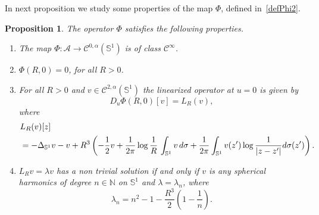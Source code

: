 \documentclass[10pt,reqno,english]{amsart}
\newcommand{\Su}{\mathbb{S}^1}
\newcommand{\N}{\mathbb{N}}
\newtheorem{prop}[lemma]{Proposition}
\theoremstyle{definition}
\numberwithin{equation}{section}
\begin{document}
In next proposition we study some properties of the map $\Phi$, defined in~\eqref{defPhi2}.

\begin{prop}
\label{prop-2d}
The operator $\Phi$ satisfies the following properties.
\begin{enumerate}
\item The map $\Phi:\mathcal A\to\mathcal C^{0,\alpha}(\Su)$ is of class $\mathcal C^\infty$.
\item $\Phi(R,0)=0$, for all $R>0$.
\item For all $R>0$ and $v\in\mathcal C^{2,\alpha}(\Su)$ the linearized operator at $u=0$ is given by
\[
D_u\Phi(R,0)[v]=L_R(v),
\]
where
\begin{align*} 
&L_R(v)[z]\\
&=- \Delta_{\mathbb{S}^1} v - v + R^3 \left( -{1\over 2} v + {1\over 2\pi} \log {1\over R} \, \int_{\mathbb{S}^1} v \,d\sigma+ {1\over 2\pi}  \int_{\mathbb{S}^1} v(z') \log {1\over |z-z'|} d\sigma (z')\right).
\end{align*}
\item $L_R v=\lambda v$ has a non trivial solution if and only if $v$ is any spherical harmonics of degree $n\in\N$ on $\Su$ and $\lambda=\lambda_n$, where
\[
\lambda_n=n^2-1-\frac{R^3}{2}\left(1-\frac{1}{n}\right).
\]
\end{enumerate}
\end{prop}
\end{document}

